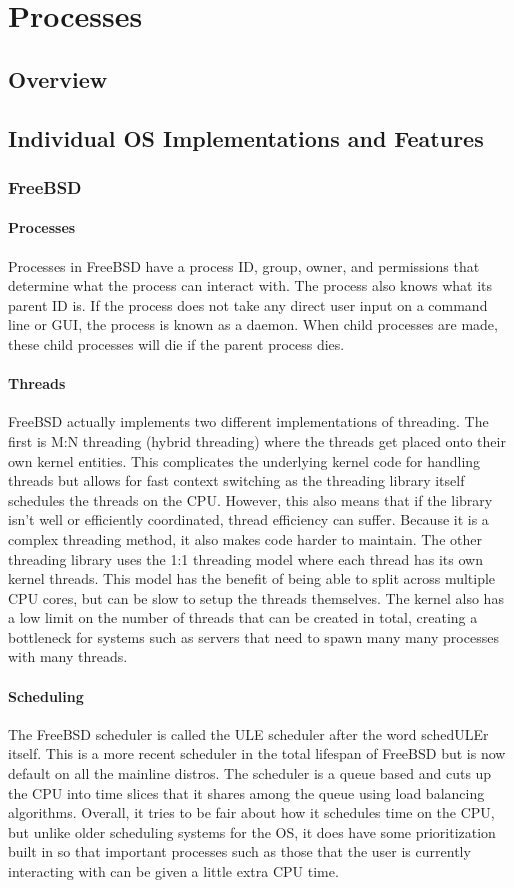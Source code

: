 \section{Processes}
\subsection{Overview}
\subsection{Individual OS Implementations and Features}
\subsubsection{FreeBSD}
\paragraph{Processes}
Processes in FreeBSD have a process ID, group, owner, and permissions that determine what the process can interact with. The process also knows what its parent ID is. If the process does not take any direct user input on a command line or GUI, the process is known as a daemon. When child processes are made, these child processes will die if the parent process dies. 
\paragraph{Threads}
FreeBSD actually implements two different implementations of threading. The first is M:N threading (hybrid threading) where the threads get placed onto their own kernel entities. This complicates the underlying kernel code for handling threads but allows for fast context switching as the threading library itself schedules the threads on the CPU. However, this also means that if the library isn't well or efficiently coordinated, thread efficiency can suffer. Because it is a complex threading method, it also makes code harder to maintain.
The other threading library uses the 1:1 threading model where each thread has its own kernel threads. This model has the benefit of being able to split across multiple CPU cores, but can be slow to setup the threads themselves. The kernel also has a low limit on the number of threads that can be created in total, creating a bottleneck for systems such as servers that need to spawn many many processes with many threads. 

\paragraph{Scheduling}
The FreeBSD scheduler is called the ULE scheduler after the word schedULEr itself. This is a more recent scheduler in the total lifespan of FreeBSD but is now default on all the mainline distros. The scheduler is a queue based and cuts up the CPU into time slices that it shares among the queue using load balancing algorithms. Overall, it tries to be fair about how it schedules time on the CPU, but unlike older scheduling systems for the OS, it does have some prioritization built in so that important processes such as those that the user is currently interacting with can be given a little extra CPU time.

